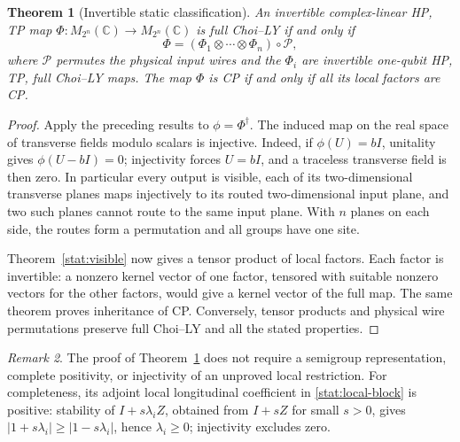\documentclass[reqno]{amsart}
\newtheorem{theorem}{Theorem}[section]
\theoremstyle{definition}
\theoremstyle{remark}
\newtheorem{remark}[theorem]{Remark}
\newcommand{\C}{\mathbb C}
\begin{document}
\begin{theorem}[Invertible static classification]
\label{stat:invertible}
An invertible complex-linear HP, TP map
\(\Phi:M_{2^n}(\C)\to M_{2^n}(\C)\) is full Choi--LY if and
only if
\begin{equation}
 \Phi=(\Phi_1\otimes\cdots\otimes\Phi_n)\circ\mathcal P,
 \label{stat:invertible-form}
\end{equation}
where \(\mathcal P\) permutes the physical input wires and the
\(\Phi_i\) are invertible one-qubit HP, TP, full Choi--LY maps.
The map \(\Phi\) is CP if and only if all its local factors are CP.
\end{theorem}

\begin{proof}
Apply the preceding results to \(\phi=\Phi^\dagger\).  The induced
map on the real space of transverse fields modulo scalars is injective.
Indeed, if \(\phi(U)=bI\), unitality gives
\(\phi(U-bI)=0\); injectivity forces \(U=bI\), and a traceless
transverse field is then zero.  In particular every output is visible,
each of its two-dimensional transverse planes maps injectively to its
routed two-dimensional input plane, and two such planes cannot route
to the same input plane.  With \(n\) planes on each side, the routes
form a permutation and all groups have one site.

Theorem~\ref{stat:visible} now gives a tensor product of local factors.
Each factor is invertible: a nonzero kernel vector of one factor,
tensored with suitable nonzero vectors for the other factors, would
give a kernel vector of the full map.  The same theorem proves
inheritance of CP.  Conversely, tensor products and physical wire
permutations preserve full Choi--LY and all the stated properties.
\end{proof}

\begin{remark}
The proof of Theorem~\ref{stat:invertible} does not require a
semigroup representation, complete positivity, or injectivity of an
unproved local restriction.  For completeness, its adjoint local
longitudinal coefficient in \eqref{stat:local-block} is positive:
stability of \(I+s\lambda_iZ\), obtained from \(I+sZ\) for small
\(s>0\), gives \(|1+s\lambda_i|\ge|1-s\lambda_i|\), hence
\(\lambda_i\ge0\); injectivity excludes zero.
\end{remark}
\end{document}
